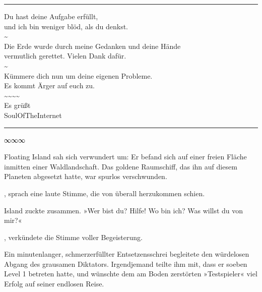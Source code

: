 \noindent \parbox{\textwidth}{ \vspace{3ex} \hrule \vspace{3ex}

    \begin{footnotesize}
    \begin{ttfamily}

\noindent Du hast deine Aufgabe erfüllt,\\
\noindent und ich bin weniger blöd, als du denkst.\\
\noindent \textasciitilde{}\\
\noindent Die Erde wurde durch meine Gedanken und deine Hände\\
\noindent vermutlich gerettet. Vielen Dank dafür.\\
\noindent \textasciitilde{}\\
\noindent Kümmere dich nun um deine eigenen Probleme.\\
\noindent Es kommt Ärger auf euch zu.\\
\noindent \textasciitilde{}\textasciitilde{}\textasciitilde{}\textasciitilde{}\\
\noindent Es grüßt\\
\noindent SoulOfTheInternet

    \end{ttfamily}
    \end{footnotesize}

\vspace{3ex} \hrule \vspace{3ex} }

\begin{center}
∞∞∞
\end{center}

Floating Island sah sich verwundert um: Er befand sich auf einer freien Fläche inmitten einer Waldlandschaft. Das goldene Raumschiff, das ihn auf diesem Planeten abgesetzt hatte, war spurlos verschwunden.

, sprach eine laute Stimme, die von überall herzukommen schien.

Island zuckte zusammen. »Wer bist du? Hilfe! Wo bin ich? Was willst du von mir?«

, verkündete die Stimme voller Begeisterung. 

Ein minutenlanger, schmerzerfüllter Entsetzensschrei begleitete den würdelosen Abgang des grausamen Diktators. Irgendjemand teilte ihm mit, dass er soeben Level 1 betreten hatte, und wünschte dem am Boden zerstörten »Testspieler« viel Erfolg auf seiner endlosen Reise.

